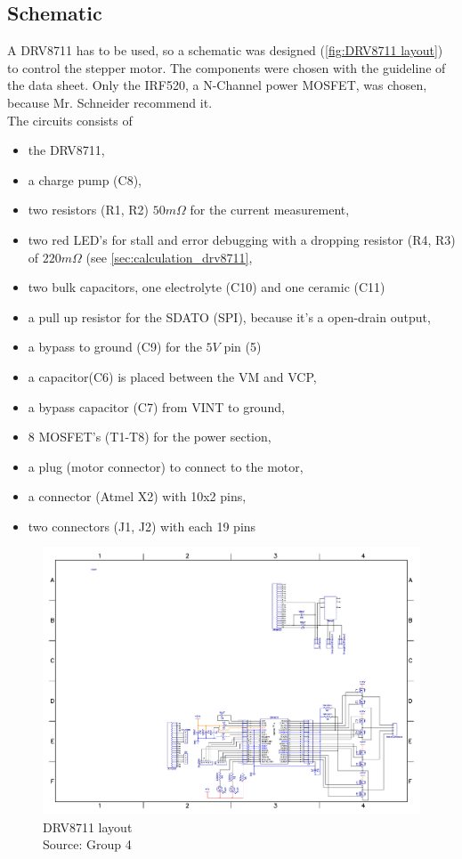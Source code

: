 \documentclass[a4paper,12pt]{scrreprt}
\begin{document}
\subsection{Schematic}
A DRV8711 has to be used, so a schematic was designed (\autoref{fig:DRV8711 layout}) to control the stepper motor. The components were chosen with the guideline of the data sheet. Only the IRF520, a N-Channel power \acs{MOSFET}, was chosen, because Mr. Schneider recommend it.\\
The circuits consists of
\begin{itemize}
\item the DRV8711,
\item a charge pump (C8),
\item two resistors (R1, R2) $50 m \Omega$ for the current measurement,
\item two red LED's for stall and error debugging with a dropping resistor (R4, R3) of $220m\Omega$ (see \autoref{sec:calculation_drv8711},
\item two bulk capacitors, one electrolyte (C10) and one ceramic (C11)
\item a pull up resistor for the SDATO (\acs{SPI}), because it's a open-drain output,
\item a bypass to ground (C9) for the $5V$ pin (5)
\item a capacitor(C6) is placed between the \acs{VM} and \acs{VCP},
\item a bypass capacitor (C7) from \acs{VINT} to ground,
\item 8 \acs{MOSFET}'s (T1-T8) for the power section,
\item a plug (motor connector) to connect to the motor,
\item a connector (Atmel X2) with 10x2 pins,
\item two connectors (J1, J2) with each 19 pins
\end{itemize}

\begin{landscape}
\begin{figure}[H]
  \centering
   \includegraphics[width=1.3\textwidth]{pictures/scematic_drv8711.pdf}
   \caption[DRV8711 layout]{DRV8711 layout\\
	Source: Group 4  
  }
   \label{fig:DRV8711 layout}
\end{figure}
\end{landscape}
\end{document}
